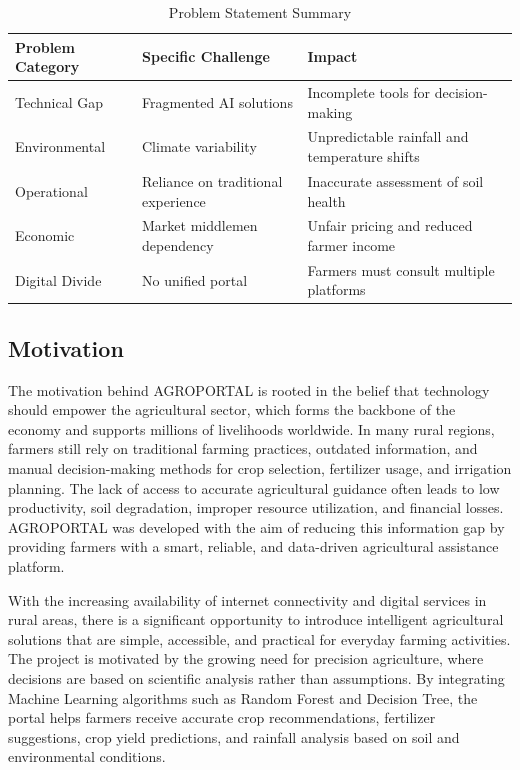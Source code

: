 \begin{table}[ht]
\centering
\caption{Problem Statement Summary}
\label{tab:problem_statement}
\begin{tabular}{|p{3.2cm}|p{4.5cm}|p{5.5cm}|}
\hline
\textbf{Problem Category} & \textbf{Specific Challenge} & \textbf{Impact} \\
\hline
Technical Gap & Fragmented AI solutions & Incomplete tools for decision-making \\
\hline
Environmental & Climate variability & Unpredictable rainfall and temperature shifts \\
\hline
Operational & Reliance on traditional experience & Inaccurate assessment of soil health \\
\hline
Economic & Market middlemen dependency & Unfair pricing and reduced farmer income \\
\hline
Digital Divide & No unified portal & Farmers must consult multiple platforms \\
\hline
\end{tabular}
\end{table}

\subsection{Motivation}

The motivation behind AGROPORTAL is rooted in the belief that technology should empower the agricultural sector, which forms the backbone of the economy and supports millions of livelihoods worldwide. In many rural regions, farmers still rely on traditional farming practices, outdated information, and manual decision-making methods for crop selection, fertilizer usage, and irrigation planning. The lack of access to accurate agricultural guidance often leads to low productivity, soil degradation, improper resource utilization, and financial losses. AGROPORTAL was developed with the aim of reducing this information gap by providing farmers with a smart, reliable, and data-driven agricultural assistance platform.

With the increasing availability of internet connectivity and digital services in rural areas, there is a significant opportunity to introduce intelligent agricultural solutions that are simple, accessible, and practical for everyday farming activities. The project is motivated by the growing need for precision agriculture, where decisions are based on scientific analysis rather than assumptions. By integrating Machine Learning algorithms such as Random Forest and Decision Tree, the portal helps farmers receive accurate crop recommendations, fertilizer suggestions, crop yield predictions, and rainfall analysis based on soil and environmental conditions.

